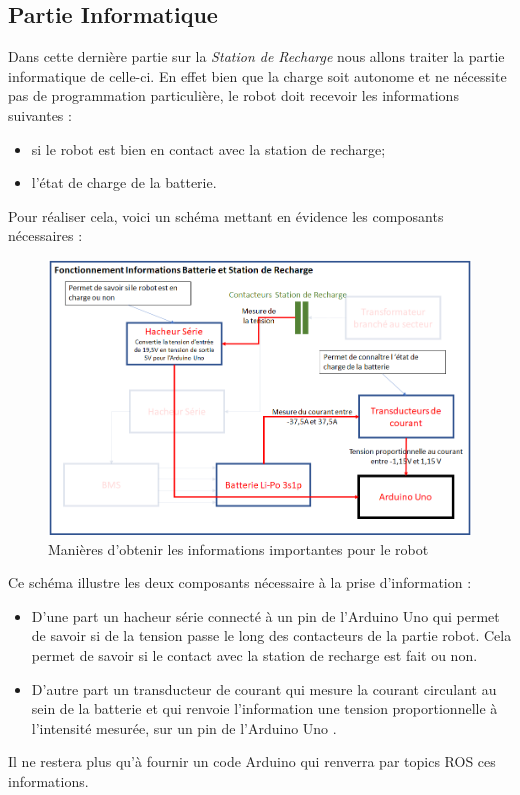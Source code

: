 \documentclass[french]{rapportENSTAB}
\begin{document}
\subsection{Partie Informatique}
Dans cette dernière partie sur la \textit{Station de Recharge} nous allons traiter la partie informatique de celle-ci. En effet bien que la charge soit autonome et ne nécessite pas de programmation particulière, le robot doit recevoir les informations suivantes : \begin{itemize}[label=\textbullet, font=\small\color{blue}]
    \item si le robot est bien en contact avec la station de recharge;
    \item l'état de charge de la batterie.
\end{itemize}

Pour réaliser cela, voici un schéma mettant en évidence les composants nécessaires : 
\begin{figure}[H]
    \centering
    \includegraphics[scale=0.75]{images/station de recharge/Archi 3.png}
    \caption{Manières d'obtenir les informations importantes pour le robot}
    \label{fig:archi capteur}
\end{figure}

Ce schéma illustre les deux composants nécessaire à la prise d'information :\begin{itemize}[label=\textbullet, font=\small\color{blue}]
    \item D'une part un hacheur série connecté à un pin de l'Arduino Uno qui permet de savoir si de la tension passe le long des contacteurs de la partie robot. Cela permet de savoir si le contact avec la station de recharge est fait ou non.
    \item D'autre part un transducteur de courant qui mesure la courant circulant au sein de la batterie et qui renvoie l'information une tension proportionnelle à l'intensité mesurée, sur un pin de l'Arduino Uno .
\end{itemize}
Il ne restera plus qu'à fournir un code Arduino qui renverra par topics ROS ces informations.
\end{document}
